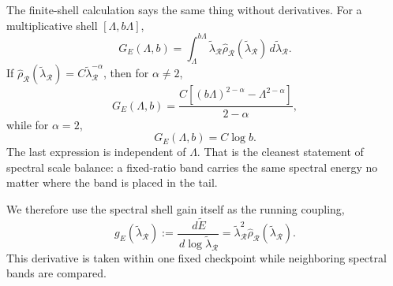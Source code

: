 \documentclass[10pt,twocolumn]{article}
\newcommand{\dd}{\,d}
\newcommand{\Rell}{\mathcal R}
\newcommand{\rhohat}{\widehat\rho}
\newcommand{\Ered}{\widetilde{E}}
\begin{document}
The finite-shell calculation says the same thing without derivatives. For a multiplicative shell $[\Lambda,b\Lambda]$,
\begin{equation}
G_E(\Lambda,b)=\int_\Lambda^{b\Lambda}\tilde{\lambda}_{\Rell}\rhohat_{\Rell}(\tilde{\lambda}_{\Rell})\dd\tilde{\lambda}_{\Rell}.
\label{eq:finite_shell}
\end{equation}
If $\rhohat_{\Rell}(\tilde{\lambda}_{\Rell})=C\tilde{\lambda}_{\Rell}^{-\alpha}$, then for $\alpha\ne2$,
\begin{equation}
G_E(\Lambda,b)=
\frac{C\left[(b\Lambda)^{2-\alpha}-\Lambda^{2-\alpha}\right]}{2-\alpha},
\label{eq:finite_shell_ne2}
\end{equation}
while for $\alpha=2$,
\begin{equation}
G_E(\Lambda,b)=C\log b.
\label{eq:finite_shell_eq2}
\end{equation}
The last expression is independent of $\Lambda$. That is the cleanest statement of spectral scale balance: a fixed-ratio band carries the same spectral energy no matter where the band is placed in the tail.

We therefore use the spectral shell gain itself as the running coupling,
\begin{equation}
g_E(\tilde{\lambda}_{\Rell})
:=
\frac{\dd\Ered}{\dd\log\tilde{\lambda}_{\Rell}}
=
\tilde{\lambda}_{\Rell}^2\rhohat_{\Rell}(\tilde{\lambda}_{\Rell}).
\label{eq:gE_correct}
\end{equation}
This derivative is taken within one fixed checkpoint while neighboring spectral bands are compared.
\end{document}
